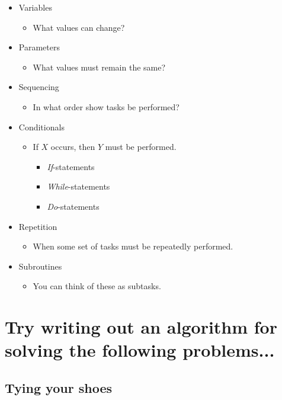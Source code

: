 \documentclass[12pt]{article}
\theoremstyle{definition}
\begin{document}
\begin{itemize}
	\item Variables
	\begin{itemize}
		\item What values can change?
	\end{itemize}	
	\item Parameters
	\begin{itemize}
		\item What values must remain the same?
	\end{itemize}	
	\item Sequencing
	\begin{itemize}
		\item In what order show tasks be performed?
	\end{itemize}	
	\item Conditionals
	\begin{itemize}
		\item If $X$ occurs, then $Y$ must be performed.
	\begin{itemize}
		\item \emph{If}-statements
		\item \emph{While}-statements
		\item \emph{Do}-statements
	\end{itemize}
	\end{itemize}	

	\item Repetition
	\begin{itemize}
		\item When some set of tasks must be repeatedly performed.
	\end{itemize}
	\item Subroutines
	\begin{itemize}
		\item You can think of these as subtasks. 
	\end{itemize}
\end{itemize}

\newpage

\section{Try writing out an algorithm for solving the following problems...}
\subsection*{Tying your shoes}

\vskip 4cm
\end{document}
